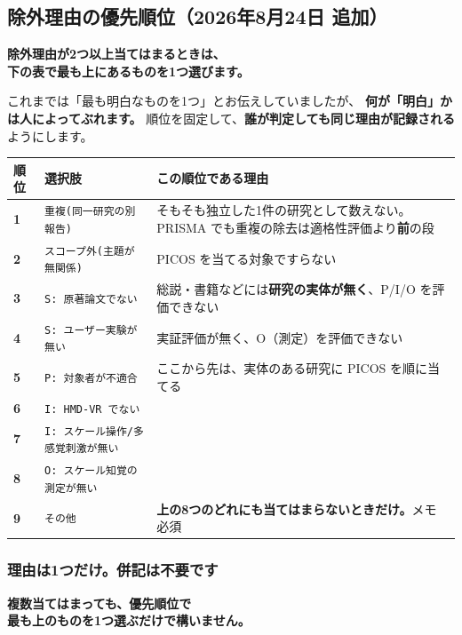 \documentclass[a4paper]{ltjsarticle}
\newcommand{\keybox}[1]{%
  \par\medskip
  \noindent\colorbox{soft}{%
    \begin{minipage}{\dimexpr\linewidth-2\fboxsep\relax}
      \vspace{2pt}\centering\bfseries\large #1\vspace{4pt}
    \end{minipage}}%
  \par\medskip}
\newcommand{\rsn}[1]{\texttt{\small #1}}
\begin{document}
\subsection{除外理由の優先順位（2026年8月24日 追加）}

\keybox{除外理由が2つ以上当てはまるときは、\\
下の表で\textbf{最も上にあるもの}を1つ選びます。}

\noindent
これまでは「最も明白なものを1つ」とお伝えしていましたが、
\textbf{何が「明白」かは人によってぶれます。}
順位を固定して、\textbf{誰が判定しても同じ理由が記録される}ようにします。

\begin{center}
\begin{tabularx}{\linewidth}{C{3.2em} L{13.5em} X}
\toprule
順位 & 選択肢 & この順位である理由 \\
\midrule
\textbf{1} & \rsn{重複(同一研究の別報告)} & そもそも独立した1件の研究として数えない。PRISMA でも重複の除去は適格性評価より\textbf{前}の段 \\
\addlinespace
\textbf{2} & \rsn{スコープ外(主題が無関係)} & PICOS を当てる対象ですらない \\
\addlinespace
\textbf{3} & \rsn{S: 原著論文でない} & 総説・書籍などには\textbf{研究の実体が無く}、P/I/O を評価できない \\
\addlinespace
\textbf{4} & \rsn{S: ユーザー実験が無い} & 実証評価が無く、O（測定）を評価できない \\
\addlinespace
\textbf{5} & \rsn{P: 対象者が不適合} & ここから先は、実体のある研究に PICOS を順に当てる \\
\addlinespace
\textbf{6} & \rsn{I: HMD-VR でない} & \\
\addlinespace
\textbf{7} & \rsn{I: スケール操作/多感覚刺激が無い} & \\
\addlinespace
\textbf{8} & \rsn{O: スケール知覚の測定が無い} & \\
\addlinespace
\textbf{9} & \rsn{その他} & \textbf{上の8つのどれにも当てはまらないときだけ。}メモ必須 \\
\bottomrule
\end{tabularx}
\end{center}

\subsubsection*{理由は1つだけ。併記は不要です}

\keybox{複数当てはまっても、優先順位で\\ 最も上のものを1つ選ぶだけで構いません。}
\end{document}
